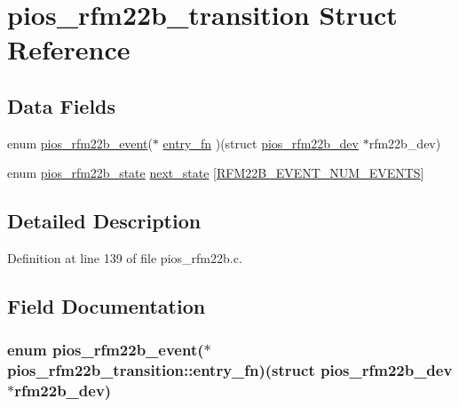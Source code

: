\hypertarget{structpios__rfm22b__transition}{\section{pios\-\_\-rfm22b\-\_\-transition \-Struct \-Reference}
\label{structpios__rfm22b__transition}
}
\subsection*{\-Data \-Fields}
\begin{DoxyCompactItemize}
\item 
enum \hyperlink{group___p_i_o_s___r_f_m22_b_gafefba9f85ea9fb8d2c610fe3759a00c2}{pios\-\_\-rfm22b\-\_\-event}($\ast$ \hyperlink{structpios__rfm22b__transition_ae70a8d2b5835fa8b0056185581d9cbeb}{entry\-\_\-fn} )(struct \hyperlink{structpios__rfm22b__dev}{pios\-\_\-rfm22b\-\_\-dev} $\ast$rfm22b\-\_\-dev)
\item 
enum \hyperlink{group___p_i_o_s___r_f_m22_b_gaf31f5344b7afb099b3105bfff4debdca}{pios\-\_\-rfm22b\-\_\-state} \hyperlink{structpios__rfm22b__transition_a0ad51f078fbfc8b875e6a26efe0b218b}{next\-\_\-state} \mbox{[}\hyperlink{group___p_i_o_s___r_f_m22_b_ggafefba9f85ea9fb8d2c610fe3759a00c2aa1f8214c33b90c900f422b7e5c2b8f31}{\-R\-F\-M22\-B\-\_\-\-E\-V\-E\-N\-T\-\_\-\-N\-U\-M\-\_\-\-E\-V\-E\-N\-T\-S}\mbox{]}
\end{DoxyCompactItemize}


\subsection{\-Detailed \-Description}


\-Definition at line 139 of file pios\-\_\-rfm22b.\-c.



\subsection{\-Field \-Documentation}
\hypertarget{structpios__rfm22b__transition_ae70a8d2b5835fa8b0056185581d9cbeb}{
\subsubsection[{entry\-\_\-fn}]{\setlength{\rightskip}{0pt plus 5cm}enum {\bf pios\-\_\-rfm22b\-\_\-event}($\ast$ {\bf pios\-\_\-rfm22b\-\_\-transition\-::entry\-\_\-fn})(struct {\bf pios\-\_\-rfm22b\-\_\-dev} $\ast$rfm22b\-\_\-dev)}}\label{structpios__rfm22b__transition_ae70a8d2b5835fa8b0056185581d9cbeb}


